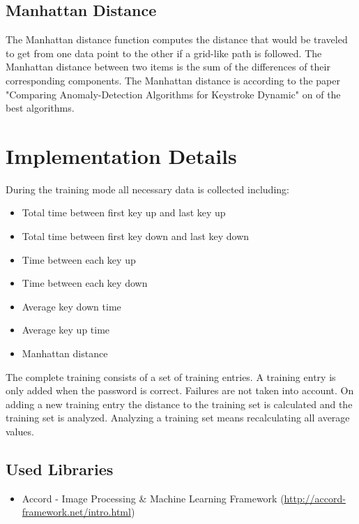 \documentclass[fleqn,10pt]{SelfArx} %
\begin{document}
\subsection{Manhattan Distance}
The Manhattan distance function computes the distance that would be traveled to get from one data point to the other if a grid-like path is followed. The Manhattan distance between two items is the sum of the differences of their corresponding components\cite{manhattan}.
\newline
The Manhattan distance is according to the paper "Comparing Anomaly-Detection Algorithms for Keystroke Dynamic" \cite{Figueredo:2009dg} on of the best algorithms. 

\section{Implementation Details}
During the training mode all necessary data is collected including:
\begin{itemize}
  \item Total time between first key up and last key up
  \item Total time between first key down and last key down
  \item Time between each key up
  \item Time between each key down
  \item Average key down time
  \item Average key up time
  \item Manhattan distance
\end{itemize}
The complete training consists of a set of training entries. A training entry is only added when the password is correct. Failures are not taken into account. On adding a new training entry the distance to the training set is calculated and the training set is analyzed. Analyzing a training set means recalculating all average values.

\subsection{Used Libraries}
\begin{itemize}
  \item Accord - Image Processing \& Machine Learning Framework (\url{http://accord-framework.net/intro.html})
\end{itemize}
\end{document}
